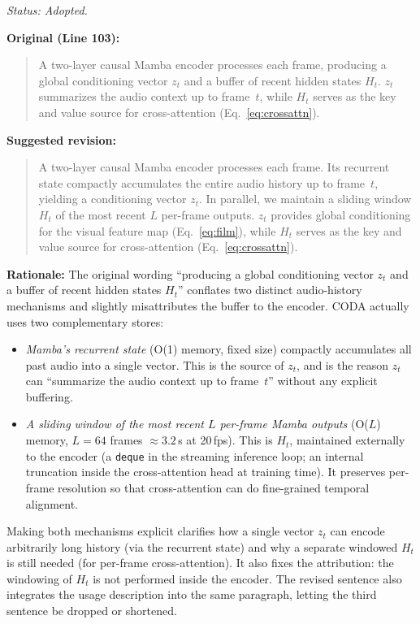 \documentclass{article}
\begin{document}
\textit{Status: Adopted.}

\textbf{Original (Line 103):}
\begin{quote}
A two-layer causal Mamba encoder processes each frame, producing a global conditioning vector $z_t$ and a buffer of recent hidden states $H_t$. $z_t$ summarizes the audio context up to frame~$t$, while $H_t$ serves as the key and value source for cross-attention (Eq.~\ref{eq:crossattn}).
\end{quote}

\textbf{Suggested revision:}
\begin{quote}
A two-layer causal Mamba encoder processes each frame. Its recurrent state compactly accumulates the entire audio history up to frame~$t$, yielding a conditioning vector $z_t$. In parallel, we maintain a sliding window $H_t$ of the most recent $L$ per-frame outputs. $z_t$ provides global conditioning for the visual feature map (Eq.~\ref{eq:film}), while $H_t$ serves as the key and value source for cross-attention (Eq.~\ref{eq:crossattn}).
\end{quote}

\textbf{Rationale:}
The original wording ``producing a global conditioning vector $z_t$ and a buffer of recent hidden states $H_t$'' conflates two distinct audio-history mechanisms and slightly misattributes the buffer to the encoder. CODA actually uses two complementary stores:
\begin{itemize}
    \item \emph{Mamba's recurrent state} (O(1) memory, fixed size) compactly accumulates all past audio into a single vector. This is the source of $z_t$, and is the reason $z_t$ can ``summarize the audio context up to frame~$t$'' without any explicit buffering.
    \item \emph{A sliding window of the most recent $L$ per-frame Mamba outputs} (O($L$) memory, $L = 64$ frames $\approx 3.2$\,s at 20\,fps). This is $H_t$, maintained externally to the encoder (a \texttt{deque} in the streaming inference loop; an internal truncation inside the cross-attention head at training time). It preserves per-frame resolution so that cross-attention can do fine-grained temporal alignment.
\end{itemize}
Making both mechanisms explicit clarifies how a single vector $z_t$ can encode arbitrarily long history (via the recurrent state) and why a separate windowed $H_t$ is still needed (for per-frame cross-attention). It also fixes the attribution: the windowing of $H_t$ is not performed inside the encoder. The revised sentence also integrates the usage description into the same paragraph, letting the third sentence be dropped or shortened.
\end{document}
